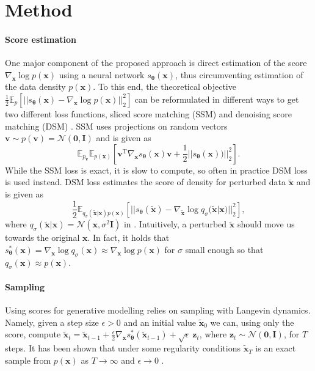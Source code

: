 \section{Method}
\label{sec:method}

\paragraph{Score estimation} \label{score_est} One major component of the proposed approach is direct estimation of the score $\nabla_{\mathbf{x}} \log p(\mathbf{x})$ using a neural network $s_{\bm{\theta}}(\mathbf{x})$, thus circumventing estimation of the data density $p(\mathbf{x})$. To this end, the theoretical objective $\frac{1}{2}\mathbb{E}_p\left[ || s_{\bm{\theta}}(\mathbf{x}) - \nabla_{\mathbf{x}} \log p(\mathbf{x})  ||^2_2 \right]$ can be reformulated in different ways to get two different loss functions, %
sliced score matching (SSM) \citep{ssm} and denoising score matching (DSM) \citep{dsm}. SSM uses projections on random vectors $\mathbf{v} \sim p(\mathbf{v}) = \mathcal{N}(\mathbf{0}, \mathbf{I})$ and is given as
\begin{equation}
\mathbb{E}_{p_{\mathbf{v}}}\mathbb{E}_{p(\mathbf{x})}\left[ \mathbf{v}^{\text{T}}\nabla_{\mathbf{x}}s_{\bm{\theta}}(\mathbf{x})\mathbf{v} + \frac{1}{2}||s_{\bm{\theta}}(\mathbf{x}))||^2_2 \right].
\end{equation}
While the SSM loss is exact, it is slow to compute, so often in practice DSM loss is used instead. DSM loss estimates the score of density for perturbed data $ \mathbf{\tilde x}$ and is given as
\begin{equation}
\frac{1}{2} \mathbb{E}_{q_\sigma ( \mathbf{ \tilde x} | \mathbf{x}) p(\mathbf{x})} \left[ || s_{\bm{\theta}}( \mathbf{ \tilde x}) - \nabla_{\mathbf{\tilde x}} \log q_\sigma( \mathbf{ \tilde x} | \mathbf{x})  ||^2_2  \right],
\end{equation}
where $q_\sigma( \mathbf{ \tilde x} | \mathbf{x}) = \mathcal{N}(\mathbf{x}, \sigma^2\mathbf{I})$ in \cite{ncsn-paper}. Intuitively, a perturbed $\mathbf{\tilde x}$ should move us towards the original $\mathbf{x}$. In fact, it holds that $s^*_{\bm{\theta}}(\mathbf{x})  = \nabla_{\mathbf{x}} \log q_{\sigma} (\mathbf{x}) \approx \nabla_{\mathbf{x}} \log p(\mathbf{x})$ for $\sigma$ small enough so that $q_{\sigma}(\mathbf{x}) \approx p(\mathbf{x})$.

\paragraph{Sampling}\label{sampling} Using scores for generative modelling relies on sampling with Langevin dynamics. Namely, given a step size $\epsilon > 0$ and an initial value $\mathbf{\tilde x}_0$ we can, using only the score, compute $\mathbf{\tilde x}_t = \mathbf{\tilde x}_{t-1} + \frac{\epsilon}{2}\nabla_{\mathbf{x}}s^*_{\bm{\theta}}(\mathbf{\tilde x}_{t-1})  + \sqrt{\epsilon}\ \mathbf{z}_t$, where $\mathbf{z}_t \sim \mathcal{N}(\mathbf{0}, \mathbf{I})$, for $T$ steps. It has been shown that under some regularity conditions $\mathbf{\tilde x}_T$ is an exact sample from $p(\mathbf{x})$ as $T \to \infty$ and $\epsilon \to 0$ \cite{Welling:2011:BLV:3104482.3104568}.

